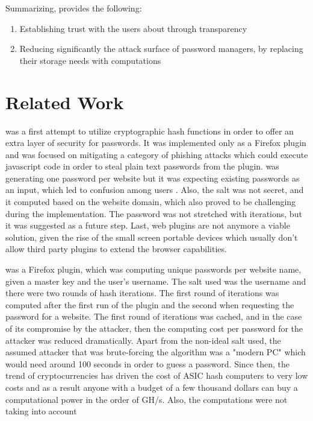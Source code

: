\documentclass{sig-alternate}
\begin{document}
Summarizing, \ours provides the following:

\begin{enumerate}
  \item Establishing trust with the users about through transparency
  \item Reducing significantly the attack surface of password managers, by replacing their
  storage needs with computations
\end{enumerate}

\section{Related Work}\label{section:related}

\pwdhash \cite{ross2005stronger} was a first attempt to utilize cryptographic hash
functions in order to offer an extra layer of security for passwords.
It was implemented only as a Firefox plugin and was focused on mitigating a
category of phishing attacks which could execute javascript code in order to steal plain text passwords
from the plugin. \pwdhash was generating one password per website but it was expecting existing
passwords as an input, which led to confusion among users \cite{chiasson2006usability}.
Also, the salt was not secret, and it computed based on the website domain, which
also proved to be challenging during the implementation.
The password was not stretched with iterations, but it was suggested as a future step.
Last, web plugins are not anymore a viable solution, given
the rise of the small screen portable devices which usually don't allow third party
plugins to extend the browser capabilities.

\pwdmul \cite{halderman2005convenient} was a Firefox plugin, which was computing
unique passwords per website name, given a master key and the user's username. The
salt used was the username and there were two rounds of hash iterations.
The first round of iterations was computed after the first run of the plugin and
the second when requesting the password for a website. The first round of iterations
was cached, and in the case of its compromise by the attacker, then the computing
cost per password for the attacker was reduced dramatically. Apart from the non-ideal
salt used, the assumed attacker that was brute-forcing the algorithm was a "modern PC"
which would need around 100 seconds in order to guess a password. Since then, the
trend of cryptocurrencies has driven the cost of ASIC hash computers to very low costs
and as a result anyone with a budget of a few thousand dollars can buy a computational
power in the order of GH/s. Also, the computations were not taking into account
\end{document}
